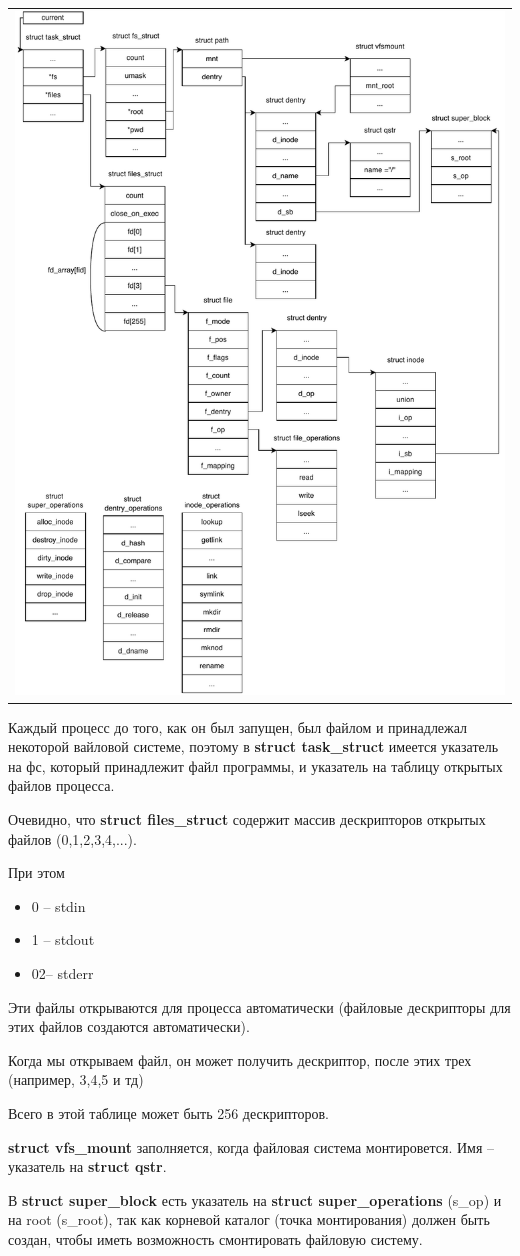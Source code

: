 \begin{table}[h!]
  \centering
  \begin{tabular}{p{1\linewidth}}
    \centering
    \includegraphics[width=0.8\linewidth]{./images/struct_connect_proc.pdf}
  \end{tabular}
\end{table}

\par Каждый процесс до того, как он был запущен, был файлом и принадлежал некоторой вайловой системе, поэтому в \textbf{struct task\_struct} имеется указатель на фс, который принадлежит файл программы, и указатель на таблицу открытых файлов процесса.
\par Очевидно, что \textbf{struct files\_struct} содержит массив дескрипторов открытых файлов (0,1,2,3,4,...).
\par При этом 
\begin{itemize}
\item 0 -- stdin
\item 1 -- stdout
\item 02-- stderr
\end{itemize}
\par Эти файлы открываются для процесса автоматически (файловые дескрипторы для этих файлов создаются автоматически).
\par Когда мы открываем файл, он может получить дескриптор, после этих трех (например, 3,4,5 и тд)
\par Всего в этой таблице может быть 256 дескрипторов.
\par \textbf{struct vfs\_mount} заполняется, когда файловая система монтировется. Имя -- указатель на \textbf{struct qstr}.
\par В \textbf{struct super\_block} есть указатель на \textbf{struct super\_operations} (s\_op) и на root (s\_root), так как корневой каталог (точка монтирования) должен быть создан, чтобы иметь возможность смонтировать файловую систему.


